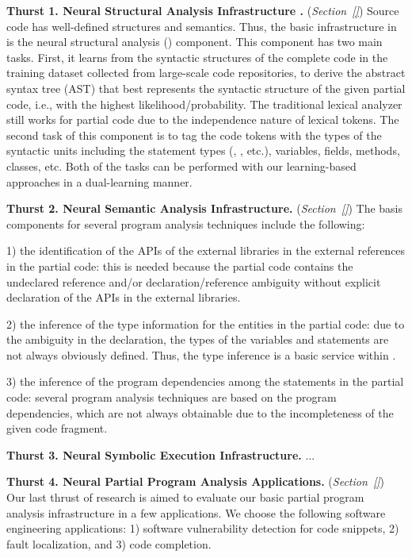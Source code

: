 \vspace{3pt}
\noindent \textbf{Thurst 1. Neural Structural Analysis Infrastructure
  .} ({\em Section~\ref{}}) Source code has
well-defined structures and semantics. Thus, the basic infrastructure
in {\tool} is the neural structural analysis ()
component.  This component has two main tasks. First, it learns from
the syntactic structures of the complete code in the training dataset
collected from large-scale code repositories, to derive the abstract
syntax tree (AST) that best represents the syntactic structure of the
given partial code, i.e., with the highest likelihood/probability.
The traditional lexical analyzer still works for partial code due to
the independence nature of lexical tokens. The second task of this
component is to tag the code tokens with the types of the syntactic
units including the statement types (, , etc.),
variables, fields, methods, classes, etc. Both of the tasks can be
performed with our learning-based approaches in a dual-learning
manner.
  
\vspace{3pt}
\noindent \textbf{Thurst 2. Neural Semantic Analysis Infrastructure.}
({\em Section~\ref{}}) The basis components for several program
analysis techniques include the following:

1) the identification of the APIs of the external libraries in the
external references in the partial code: this is needed because the
partial code contains the undeclared reference and/or
declaration/reference ambiguity without explicit declaration of the
APIs in the external libraries.

2) the inference of the type information for the entities in the
partial code: due to the ambiguity in the declaration, the types of
the variables and statements are not always obviously defined. Thus,
the type inference is a basic service within {\tool}.

3) the inference of the program dependencies among the statements in
the partial code: several program analysis techniques are based on the
program dependencies, which are not always obtainable due to the
incompleteness of the given code fragment.

\vspace{3pt}
\noindent \textbf{Thurst 3. Neural Symbolic Execution Infrastructure.}
...

\vspace{3pt}
\noindent \textbf{Thurst 4. Neural Partial Program Analysis
  Applications.}  ({\em Section~\ref{}}) Our last thrust of research
is aimed to evaluate our basic partial program analysis infrastructure
in a few applications. We choose the following software engineering
applications: 1) software vulnerability detection for code snippets,
2) fault localization, and 3) code completion.

